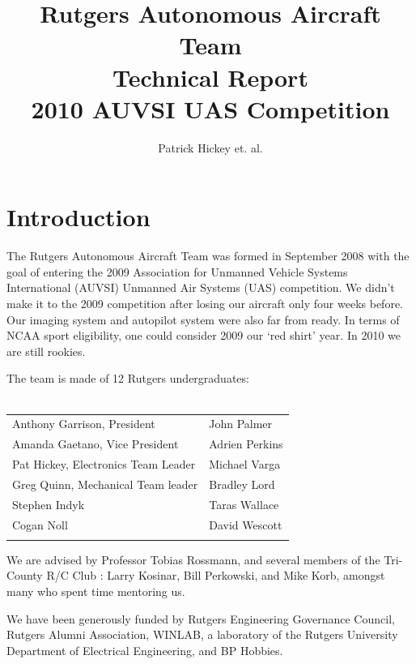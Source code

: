\documentclass[10pt]{report}
\begin{document}
\title{Rutgers Autonomous Aircraft Team\\Technical Report\\2010 AUVSI UAS Competition}
\author{Patrick Hickey et. al.}



\section{Introduction}

The Rutgers Autonomous Aircraft Team was formed in September 2008 with the goal of entering the 2009 Association for Unmanned Vehicle Systems International (AUVSI)\cite{auvsiweb} Unmanned Air Systems (UAS) competition\cite{uasweb}. We didn't make it to the 2009 competition after losing our aircraft only four weeks before. Our imaging system and autopilot system were also far from ready. In terms of NCAA sport eligibility, one could consider 2009 our `red shirt' year. In 2010 we are still rookies.

The team is made of 12 Rutgers undergraduates:\\
\\ \begin{tabular}{l l}
Anthony Garrison, President & John Palmer \\
Amanda Gaetano, Vice President & Adrien Perkins\\
Pat Hickey, Electronics Team Leader & Michael Varga\\
Greg Quinn, Mechanical Team leader & Bradley Lord\\
Stephen Indyk & Taras Wallace\\ 
Cogan Noll & David Wescott\\ \\
\end{tabular}

We are advised by
 Professor Tobias Rossmann,
 and several members of the Tri-County R/C Club \cite{tricountyRC}:
 Larry Kosinar,
 Bill Perkowski,
and  Mike Korb, 
amongst many who spent time mentoring us.

We have been generously funded by 
Rutgers Engineering Governance Council,
Rutgers Alumni Association,
WINLAB, a laboratory of the Rutgers University Department of Electrical Engineering, 
and BP Hobbies. 
\end{document}
